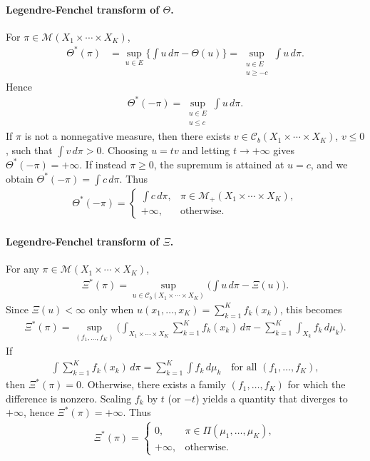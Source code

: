 \documentclass[twoside,11pt,a4paper]{article}
\begin{document}
\paragraph{Legendre-Fenchel transform of \(\Theta\).}
For \(\pi\in \mathcal{M}(X_{1}\times\cdots\times X_{K})\),
\begin{align*}
\Theta^{\ast}(\pi)
&=
\sup_{u\in E}
\Big\{
\int u\, d\pi - \Theta(u)
\Big\}
=
\sup_{\substack{u\in E\\ u\ge -c}}
\int u\, d\pi.
\end{align*}
Hence
\begin{align*}
\Theta^{\ast}(-\pi)
=
\sup_{\substack{u\in E\\ u\le c}}
\int u\, d\pi.
\end{align*}
If \(\pi\) is not a nonnegative measure, then there exists
\(v\in \mathcal{C}_{b}(X_{1}\times\cdots\times X_{K})\), \(v\le 0\), such that
\(\int v\, d\pi>0\). Choosing \(u=t v\) and letting \(t\to +\infty\)
gives \(\Theta^{\ast}(-\pi)=+\infty\). If instead \(\pi\ge 0\), the supremum is attained at \(u=c\), and we obtain $\Theta^{\ast}(-\pi)=\int c\, d\pi$. Thus
\begin{align*}
\Theta^{\ast}(-\pi)
=
\begin{cases}
\displaystyle \int c\, d\pi, & \pi\in \mathcal{M}_{+}(X_{1}\times\cdots\times X_{K}),\\[0.3em]
+\infty, & \text{otherwise}.
\end{cases}
\end{align*}
\paragraph{Legendre-Fenchel transform of \(\Xi\).}
For any \(\pi\in \mathcal{M}(X_{1}\times\cdots\times X_{K})\),
\begin{align*}
\Xi^{\ast}(\pi)
=
\sup_{u\in \mathcal{C}_{b}(X_{1}\times\cdots\times X_{K})}
\Big(
\int u\, d\pi - \Xi(u)
\Big).
\end{align*}
Since \(\Xi(u)<\infty\) only when 
\(
u(x_{1},\ldots,x_{K})=\sum_{k=1}^{K} f_{k}(x_{k})
\),
this becomes
\begin{align*}
\Xi^{\ast}(\pi)
=
\sup_{(f_{1},\ldots,f_{K})}
\Bigg(
\int_{X_{1}\times\cdots\times X_{K}}
\sum_{k=1}^{K} f_{k}(x_{k})\, d\pi
-
\sum_{k=1}^{K} \int_{X_{k}} f_{k} \, d\mu_{k}
\Bigg).
\end{align*}
If
\begin{align*}
\int \sum_{k=1}^{K} f_{k}(x_{k})\, d\pi
=
\sum_{k=1}^{K} \int f_{k}\, d\mu_{k}
\quad\text{for all }(f_{1},\ldots,f_{K}),
\end{align*}
then \(\Xi^{\ast}(\pi)=0\). Otherwise, there exists a family \((f_{1},\ldots,f_{K})\) for which the
difference is nonzero. Scaling \(f_{k}\) by \(t\) (or \(-t\)) yields a
quantity that diverges to \(+\infty\), hence \(\Xi^{\ast}(\pi)=+\infty\). Thus
\begin{align*}
\Xi^{\ast}(\pi)
=
\begin{cases}
0, & \pi\in \Pi(\mu_{1},\ldots,\mu_{K}),\\[0.3em]
+\infty, & \text{otherwise.}
\end{cases}
\end{align*}
\end{document}
